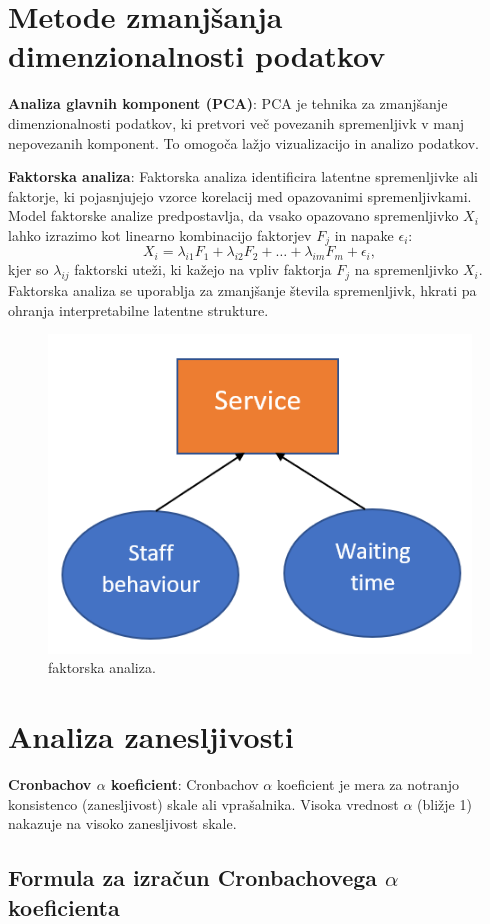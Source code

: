 \section{Metode zmanjšanja dimenzionalnosti podatkov}

\textbf{Analiza glavnih komponent (PCA)}:
PCA je tehnika za zmanjšanje dimenzionalnosti podatkov, ki pretvori več povezanih spremenljivk v manj nepovezanih komponent. To omogoča lažjo vizualizacijo in analizo podatkov.

\textbf{Faktorska analiza}:
Faktorska analiza identificira latentne spremenljivke ali faktorje, ki pojasnjujejo vzorce korelacij med opazovanimi spremenljivkami. Model faktorske analize predpostavlja, da vsako opazovano spremenljivko $X_i$ lahko izrazimo kot linearno kombinacijo faktorjev $F_j$ in napake $\epsilon_i$:
\[X_i = \lambda_{i1} F_1 + \lambda_{i2} F_2 + \ldots + \lambda_{im} F_m + \epsilon_i,\]
kjer so $\lambda_{ij}$ faktorski uteži, ki kažejo na vpliv faktorja $F_j$ na spremenljivko $X_i$. Faktorska analiza se uporablja za zmanjšanje števila spremenljivk, hkrati pa ohranja interpretabilne latentne strukture.

\begin{figure}[h]
    \centering
    \includegraphics[width=0.5 \textwidth]{pictures/faktorska_analiza.png}
    \caption{faktorska analiza.}
    \label{fig:faktorska}
\end{figure}

\section{Analiza zanesljivosti}

\textbf{Cronbachov $\alpha$ koeficient}:
Cronbachov $\alpha$ koeficient je mera za notranjo konsistenco (zanesljivost) skale ali vprašalnika. Visoka vrednost $\alpha$ (bližje 1) nakazuje na visoko zanesljivost skale.

\subsection*{Formula za izračun Cronbachovega $\alpha$ koeficienta}

